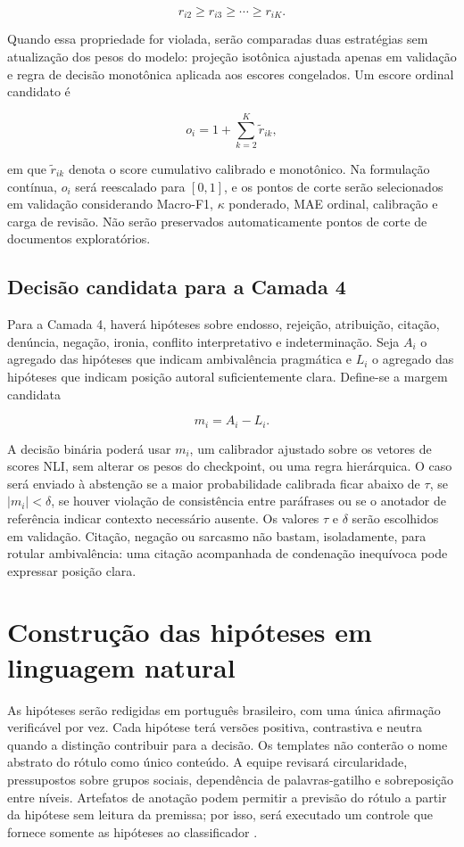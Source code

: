 \[
r_{i2}\geq r_{i3}\geq\cdots\geq r_{iK}.
\]

Quando essa propriedade for violada, serão comparadas duas estratégias sem atualização dos pesos do modelo: projeção isotônica ajustada apenas em validação e regra de decisão monotônica aplicada aos escores congelados. Um escore ordinal candidato é

\[
o_i=1+\sum_{k=2}^{K}\widetilde r_{ik},
\]

em que \(\widetilde r_{ik}\) denota o score cumulativo calibrado e monotônico. Na formulação contínua, \(o_i\) será reescalado para \([0,1]\), e os pontos de corte serão selecionados em validação considerando Macro-F1, \(\kappa\) ponderado, MAE ordinal, calibração e carga de revisão. Não serão preservados automaticamente pontos de corte de documentos exploratórios.

\subsection{Decisão candidata para a Camada 4}

Para a Camada 4, haverá hipóteses sobre endosso, rejeição, atribuição, citação, denúncia, negação, ironia, conflito interpretativo e indeterminação. Seja \(A_i\) o agregado das hipóteses que indicam ambivalência pragmática e \(L_i\) o agregado das hipóteses que indicam posição autoral suficientemente clara. Define-se a margem candidata

\[
m_i=A_i-L_i.
\]

A decisão binária poderá usar \(m_i\), um calibrador ajustado sobre os vetores de scores NLI, sem alterar os pesos do checkpoint, ou uma regra hierárquica. O caso será enviado à abstenção se a maior probabilidade calibrada ficar abaixo de \(\tau\), se \(|m_i|<\delta\), se houver violação de consistência entre paráfrases ou se o anotador de referência indicar contexto necessário ausente. Os valores \(\tau\) e \(\delta\) serão escolhidos em validação. Citação, negação ou sarcasmo não bastam, isoladamente, para rotular ambivalência: uma citação acompanhada de condenação inequívoca pode expressar posição clara.

\section{Construção das hipóteses em linguagem natural}
\label{sec:hipoteses-linguagem}

As hipóteses serão redigidas em português brasileiro, com uma única afirmação verificável por vez. Cada hipótese terá versões positiva, contrastiva e neutra quando a distinção contribuir para a decisão. Os templates não conterão o nome abstrato do rótulo como único conteúdo. A equipe revisará circularidade, pressupostos sobre grupos sociais, dependência de palavras-gatilho e sobreposição entre níveis. Artefatos de anotação podem permitir a previsão do rótulo a partir da hipótese sem leitura da premissa; por isso, será executado um controle que fornece somente as hipóteses ao classificador \cite{gururangan2018}.


